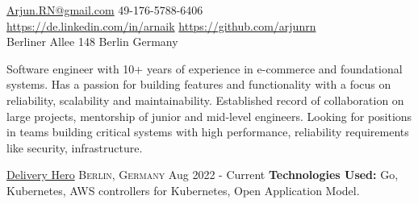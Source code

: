 \documentclass[10pt,a4paper]{article}
\begin{document}
\sloppy  %


\nobreakvspace{0.3em}  %

\noindent\href{mailto:Arjun.RN@gmail.com}{Arjun.RN\mbox{}@\mbox{}gmail.com}\sbull
\textsmaller{+}49-176-5788-6406
\\
\sbull
\href{https://de.linkedin.com/in/arnaik}{https://de.linkedin.com/in/arnaik}
\sbull
\href{https://github.com/arjunrn}{https://github.com/arjunrn}
\\
Berliner Allee 148\sbull
Berlin\sbull
Germany

\spacedhrule{0.9em}{-0.4em}  %


\vspace{-1.3em}  %

\begin{multicols}{2}  %
	Software engineer with 10+ years of experience in e-commerce and
	foundational systems. Has a passion for building features and functionality
	with a focus on reliability, scalability and maintainability. Established
	record of collaboration on large projects, mentorship of junior and
	mid-level engineers. Looking for positions in teams building critical
	systems with high performance, reliability requirements like security,
	infrastructure.
\end{multicols}

\spacedhrule{0em}{-0.4em}


\headedsection
{\href{https://deliveryhero.com/}{Delivery Hero}}
{\textsc{Berlin, Germany}}
{
	\headedsubsection
	{}
	{Aug 2022 - Current}
	{
		\textbf{Technologies Used:} Go, Kubernetes, AWS controllers for Kubernetes, Open Application Model.
	}
}
\end{document}
